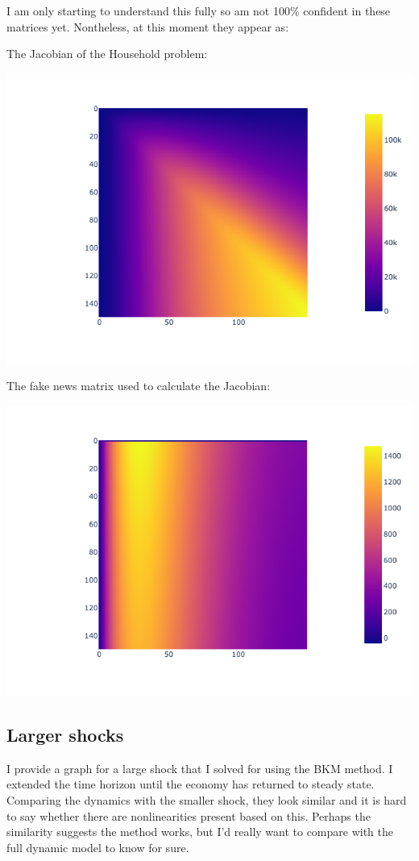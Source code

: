 I am only starting to understand this fully so am not 100\% confident in these matrices yet. Nontheless, at this moment they appear as:

The Jacobian of the Household problem:

\includegraphics[scale = 0.75]{figures/jacobian.png}

The fake news matrix used to calculate the Jacobian:

\includegraphics[scale = 0.75]{figures/fake_news.png}

\subsection{Larger shocks}

I provide a graph for a large shock that I solved for using the BKM method. I extended the time horizon until the economy has returned to steady state. Comparing the dynamics with the smaller shock, they look similar and it is hard to say whether there are nonlinearities present based on this. Perhaps the similarity suggests the method works, but I'd really want to compare with the full dynamic model to know for sure.

